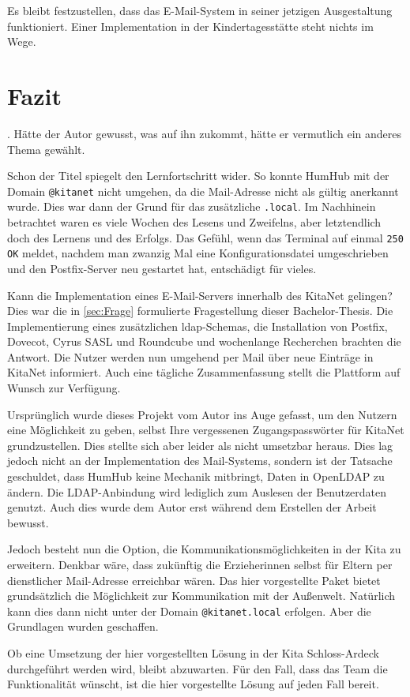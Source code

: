 Es bleibt festzustellen, dass das E-Mail-System in seiner jetzigen Ausgestaltung funktioniert. Einer Implementation in der Kindertagesstätte steht nichts im Wege.

\chapter{Fazit}
\label{sec:Fazit}

 \citep[][1109]{Kofler2020}. 
Hätte der Autor gewusst, was auf ihn zukommt, hätte er vermutlich ein anderes Thema gewählt. 

Schon der Titel spiegelt den Lernfortschritt wider. 
So konnte HumHub mit der Domain \verb+@kitanet+ nicht umgehen, da die Mail-Adresse nicht als gültig anerkannt wurde. 
Dies war dann der Grund für das zusätzliche \verb+.local+.
Im Nachhinein betrachtet waren es viele Wochen des Lesens und Zweifelns, aber letztendlich doch des Lernens und des Erfolgs.
Das Gefühl, wenn das Terminal auf einmal \verb+250 OK+ meldet, nachdem man zwanzig Mal eine Konfigurationsdatei umgeschrieben und den Postfix-Server neu gestartet hat, entschädigt für vieles.

Kann die Implementation eines E-Mail-Servers innerhalb des KitaNet gelingen? Dies war die in \autoref{sec:Frage} formulierte Fragestellung dieser Bachelor-Thesis. 
Die Implementierung eines zusätzlichen \ac{ldap}-Schemas, die Installation von Postfix, Dovecot, Cyrus SASL und Roundcube und wochenlange Recherchen brachten die Antwort. 
Die Nutzer werden nun umgehend per Mail über neue Einträge in KitaNet informiert. Auch eine tägliche Zusammenfassung stellt die Plattform  auf Wunsch zur Verfügung.

Ursprünglich wurde dieses Projekt vom Autor ins Auge gefasst, um den Nutzern eine Möglichkeit zu geben, selbst Ihre vergessenen Zugangspasswörter für KitaNet grundzustellen.
Dies stellte sich aber leider als nicht umsetzbar heraus. 
Dies lag jedoch nicht an der Implementation des Mail-Systems, sondern ist der Tatsache geschuldet, dass HumHub keine Mechanik mitbringt, Daten in OpenLDAP zu ändern. 
Die LDAP-Anbindung wird lediglich zum Auslesen der Benutzerdaten genutzt. 
Auch dies wurde dem Autor erst während dem Erstellen der Arbeit bewusst.

Jedoch besteht nun die Option, die Kommunikationsmöglichkeiten in der Kita zu erweitern. 
Denkbar wäre, dass zukünftig die Erzieherinnen selbst für Eltern per dienstlicher Mail-Adresse erreichbar wären. 
Das hier vorgestellte Paket bietet grundsätzlich die Möglichkeit zur Kommunikation mit der Außenwelt.
Natürlich kann dies dann nicht unter der Domain \verb+@kitanet.local+ erfolgen. 
Aber die Grundlagen wurden geschaffen.

Ob eine Umsetzung der hier vorgestellten Lösung in der Kita Schloss-Ardeck durchgeführt werden wird, bleibt abzuwarten.
Für den Fall, dass das Team die Funktionalität wünscht, ist die hier vorgestellte Lösung auf jeden Fall bereit.
